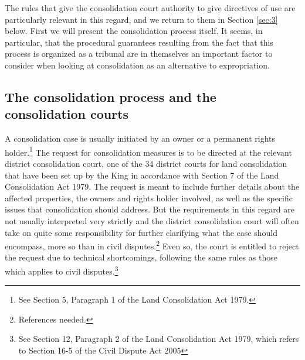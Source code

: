 \documentclass[10pt]{article} %
\begin{document}
The rules that give the consolidation court authority to give directives of use are particularly relevant in this regard, and we return to them in Section \ref{sec:3} below. First we will present the consolidation process itself. It seems, in particular, that the procedural guarantees resulting from the fact that this process is organized as a tribunal are in themselves an important factor to consider when looking at consolidation as an alternative to expropriation.

\subsection{The consolidation process and the consolidation courts}\label{subsec:21}

A consolidation case is usually initiated by an owner or a permanent rights holder.\footnote{See Section 5, Paragraph 1 of the Land Consolidation Act 1979.} The request for consolidation measures is to be directed at the relevant district consolidation court, one of the 34 district courts for land consolidation that have been set up by the King in accordance with Section 7 of the Land Consolidation Act 1979. The request is meant to include further details about the affected properties, the owners and rights holder involved, as well as the specific issues that consolidation should address. But the requirements in this regard are not usually interpreted very strictly and the district consolidation court will often take on quite some responsibility for further clarifying what the case should encompass, more so than in civil disputes.\footnote{References needed.} Even so, the court is entitled to reject the request due to technical shortcomings, following the same rules as those which applies to civil disputes.\footnote{See Section 12, Paragraph 2 of the Land Consolidation Act 1979, which refers to Section 16-5 of the Civil Dispute Act 2005}
\end{document}
